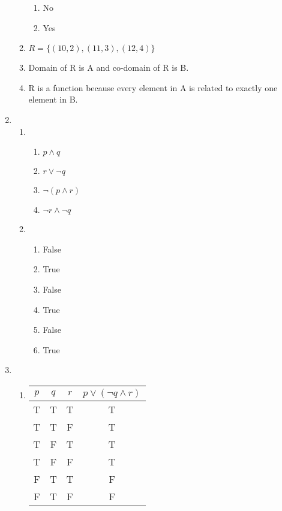 \documentclass{article}
\begin{document}
\begin{enumerate}
\begin{enumerate}
        \begin{enumerate}
            \item No
            \item Yes
        \end{enumerate}
        \item $R = \{(10, 2), (11, 3), (12, 4)\}$
        \item Domain of R is A and co-domain of R is B.
        \item R is a function because every element in A is related to exactly one element in B.
    \end{enumerate}
    \item 
    \begin{enumerate}
        \item 
        \begin{enumerate}
            \item $p \land q$
            \item $r \lor \neg q$
            \item $\neg (p \land r)$
            \item $\neg r \land \neg q$
        \end{enumerate}
        \item 
        \begin{enumerate}
            \item False
            \item True
            \item False
            \item True
            \item False
            \item True
        \end{enumerate}
    \end{enumerate}
    \item 
    \begin{enumerate}
        \item 
        \begin{tabular}{|c|c|c|c|}
            \hline
            $p$ & $q$ & $r$ & $p \lor (\neg q \land r)$ \\
            \hline
            T & T & T & T \\
            T & T & F & T \\
            T & F & T & T \\
            T & F & F & T \\
            F & T & T & F \\
            F & T & F & F \\

\end{tabular}
\end{enumerate}
\end{enumerate}
\end{document}
